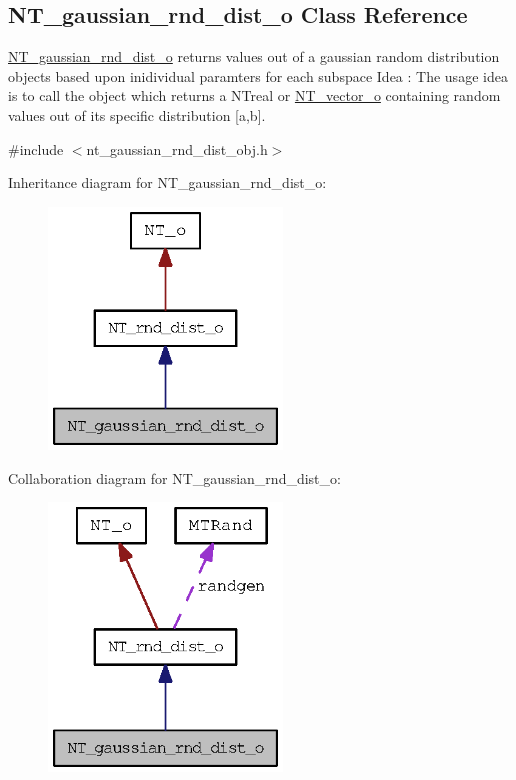 \subsection{NT\_\-gaussian\_\-rnd\_\-dist\_\-o Class Reference}
\label{class_n_t__gaussian__rnd__dist__o}


\hyperlink{class_n_t__gaussian__rnd__dist__o}{NT\_\-gaussian\_\-rnd\_\-dist\_\-o} returns values out of a gaussian random distribution objects based upon inidividual paramters for each subspace Idea : The usage idea is to call the object which returns a NTreal or \hyperlink{class_n_t__vector__o}{NT\_\-vector\_\-o} containing random values out of its specific distribution \mbox{[}a,b\mbox{]}.  




{\ttfamily \#include $<$nt\_\-gaussian\_\-rnd\_\-dist\_\-obj.h$>$}



Inheritance diagram for NT\_\-gaussian\_\-rnd\_\-dist\_\-o:
\nopagebreak
\begin{figure}[H]
\begin{center}
\leavevmode
\includegraphics[width=176pt]{class_n_t__gaussian__rnd__dist__o__inherit__graph}
\end{center}
\end{figure}


Collaboration diagram for NT\_\-gaussian\_\-rnd\_\-dist\_\-o:
\nopagebreak
\begin{figure}[H]
\begin{center}
\leavevmode
\includegraphics[width=176pt]{class_n_t__gaussian__rnd__dist__o__coll__graph}
\end{center}
\end{figure}
